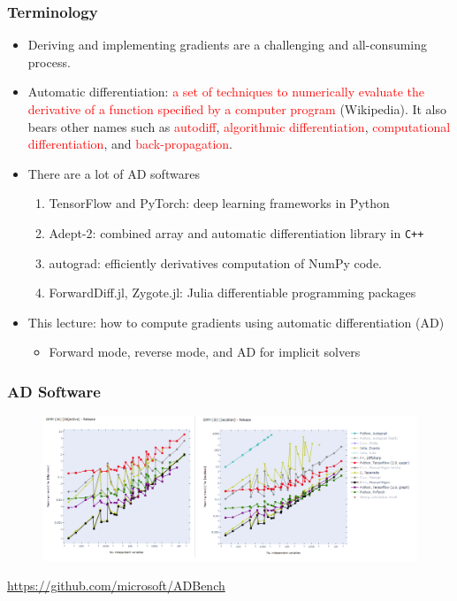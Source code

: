 \documentclass{beamer}
\newcommand{\red}[1]{\textcolor{red}{#1}}
\begin{document}
\begin{frame}
	\frametitle{Terminology}
	
	\begin{itemize}
	
	\item Deriving and implementing gradients are a challenging and all-consuming process. 
	
		\item Automatic differentiation: \red{a set of techniques to numerically evaluate the derivative of a function specified by a computer program} (Wikipedia). It also bears other names such as \red{autodiff}, \red{algorithmic differentiation}, \red{computational differentiation}, and \red{back-propagation}. 


		\item There are a lot of AD softwares
		\begin{enumerate}
			\item TensorFlow and PyTorch: deep learning frameworks in Python
			\item Adept-2: combined array and automatic differentiation library in \texttt{C++} 
			\item autograd: efficiently derivatives computation of NumPy code.
			\item ForwardDiff.jl, Zygote.jl: Julia differentiable programming packages
		\end{enumerate}
		
		 
		\item This lecture: how to compute gradients using automatic differentiation (AD)

\begin{itemize}	
	\item  Forward mode, reverse mode, and AD for implicit solvers 
	\end{itemize}
	
	
		
		 
	\end{itemize}
\end{frame}

\begin{frame}
	\frametitle{AD Software}
	
	\begin{figure}[hbt]
  \includegraphics[width=1.0\textwidth]{figures/ad_performance}
\end{figure}

{\scriptsize \url{https://github.com/microsoft/ADBench}}

\end{frame}
\end{document}
